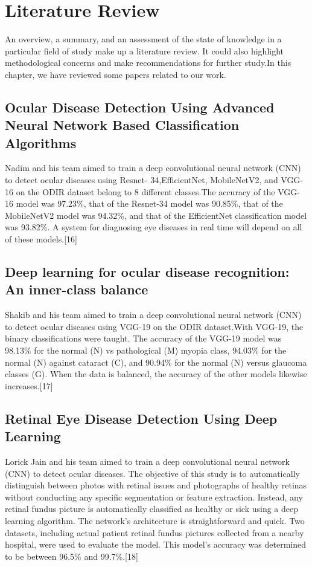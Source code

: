 
\chapter{Literature Review}

An overview, a summary, and an assessment of the state of knowledge in a particular field of study make up a literature review. It could also highlight methodological concerns and make recommendations for further study.In this chapter, we have reviewed some papers related to our work.


\section{Ocular Disease Detection Using Advanced Neural Network Based Classification Algorithms}
Nadim and his team aimed to train a deep convolutional neural network (CNN) to detect ocular diseases using Resnet- 34,EfficientNet, MobileNetV2, and VGG-16 on the ODIR
dataset belong to 8 different classes.The accuracy of the VGG- 16 model was 97.23\%, that of the Resnet-34 model was 90.85\%, that of the MobileNetV2 model was 94.32\%, and that of the EfficientNet classification model was 93.82\%. A system for diagnosing eye diseases in real time will depend on all of these models.[16]
\section{Deep learning for ocular disease recognition: An inner-class balance}
Shakib and his team aimed to train a deep convolutional neural network (CNN) to detect ocular diseases using VGG-19 on the ODIR dataset.With VGG-19, the binary classifications were taught. The accuracy of the VGG-19 model was 98.13\% for the normal (N) vs pathological (M) myopia class, 94.03\% for the normal (N) against cataract (C), and 90.94\% for the normal (N) versus glaucoma classes (G). When the data is balanced, the accuracy of the other models likewise increases.[17]
\section{Retinal Eye Disease Detection Using Deep Learning}
Lorick Jain and his team aimed to train a deep convolutional neural network (CNN) to detect ocular diseases. The objective of this study is to automatically distinguish between photos with retinal issues and photographs of healthy retinas without conducting any specific segmentation or feature extraction. Instead, any retinal fundus picture is automatically classified as healthy or sick using a deep learning algorithm. The network’s architecture is straightforward and quick. Two datasets, including actual patient retinal fundus pictures collected from a nearby hospital, were used to evaluate the model. This model’s accuracy was determined to be between 96.5\% and 99.7\%.[18]
